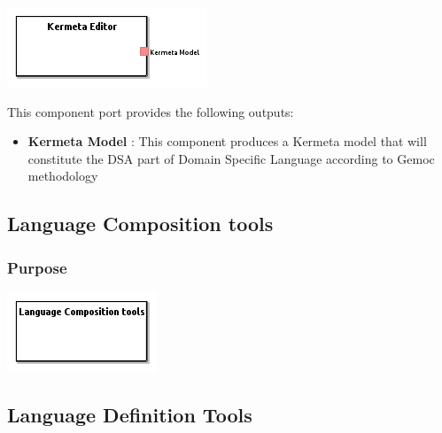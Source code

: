 \documentclass{gemoc} %
\begin{document}
\begin{center}
\includegraphics*[trim=0.0cm 0.0cm 0cm 0.0cm, clip=true]{../images/generated/Generated_Kermeta_Editor.png}
\end{center}


This component port provides the following outputs:
\begin{itemize}
  \item \textbf{Kermeta Model} :
This component produces a Kermeta model that will constitute the DSA part of Domain Specific Language according to Gemoc methodology 
\end{itemize}


\subsection{Language Composition tools}


\subsubsection{Purpose}


\begin{center}
\includegraphics*[trim=0.0cm 0.0cm 0cm 0.0cm, clip=true]{../images/generated/Generated_Language_Composition_tools.png}
\end{center}




\subsection{Language Definition Tools}
\end{document}
